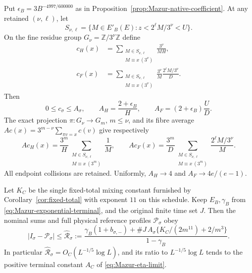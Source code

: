 \begin{proposition}
\label{prop:Mazur-genuine-caps}
Put $\epsilon_B=3B^{-4997/600000}$ as in
Proposition~\ref{prop:Mazur-native-coefficient}. At any retained
$(\nu,\ell)$, let
\[
 S_{\nu,\ell}=\{M\in E'_B(E):z<2^\ell M/3^\nu<U\}.
\]
On the fine residue group $G_\nu=\mathbb Z/3^\nu\mathbb Z$ define
\begin{align*}
 c_H(x)&=\sum_{\substack{M\in S_{\nu,\ell}\\M\equiv x\ (3^\nu)}}
                       \frac{3^\nu}{MH},\\
 c_F(x)&=\sum_{\substack{M\in S_{\nu,\ell}\\M\equiv x\ (3^\nu)}}
                       \frac{3^\nu}{M}\frac{2^\ell M/3^\nu}{D}.
\end{align*}
Then
\begin{equation}
 0\le c_\sigma\le A_\sigma,\qquad
 A_H=\frac{2+\epsilon_B}{H},\qquad
 A_F=(2+\epsilon_B)\frac UD .
 \label{eq:Mazur-genuine-caps}
\end{equation}
The exact projection $\pi:G_\nu\to G_m$, $m\le\nu$, and its fibre average
$Ac(x)=3^{m-\nu}\sum_{\pi v=x}c(v)$ give respectively
\[
 Ac_H(x)=\frac{3^m}H
       \sum_{\substack{M\in S_{\nu,\ell}\\M\equiv x\ (3^m)}}\frac1M,\qquad
 Ac_F(x)=\frac{3^m}D
       \sum_{\substack{M\in S_{\nu,\ell}\\M\equiv x\ (3^m)}}
                       \frac{2^\ell M/3^\nu}{M}.
\]
All endpoint collisions are retained. Uniformly,
$A_H\to4$ and $A_F\to4e/(e-1)$.

Let $K_C$ be the single fixed-total mixing constant furnished by
Corollary~\ref{cor:fixed-total} with exponent $11$ on this schedule.
Keep $E_B,\gamma_B$ from \eqref{eq:Mazur-exponential-terminal}, and
the original finite time set $J$. Then the nominal sums and full physical
reference profiles $\mathcal P_\sigma$ obey
\begin{equation}
 |I_\sigma-\mathcal P_\sigma|
 \le\widehat{\mathcal R}_\sigma:=
 \frac{\gamma_B(1+b_{\sigma,-})+
   \#J\,A_\sigma\{K_C/(2m^{11})+2/m^3\}}{1-\gamma_B}.
 \label{eq:Mazur-genuine-terminal}
\end{equation}
In particular $\widehat{\mathcal R}_\sigma=O_C(L^{-1/5}\log L)$,
and its ratio to $L^{-1/5}\log L$ tends to the positive terminal
constant $A_C$ of \eqref{eq:Mazur-eta-limit}.
\end{proposition}
